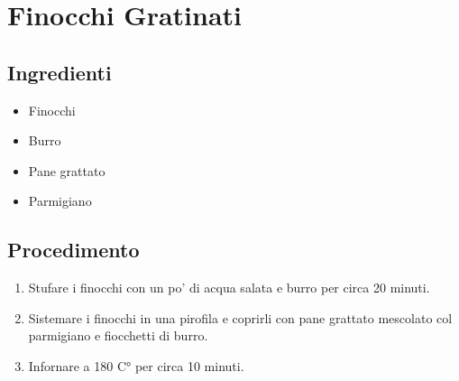 \section{Finocchi Gratinati}
\subsection{Ingredienti}
\begin{itemize}
\item Finocchi  
\item Burro  
\item Pane grattato  
\item Parmigiano
\end{itemize}
\subsection{Procedimento}
\begin{enumerate}
\item  Stufare i finocchi con un po' di acqua salata e burro per circa 20 minuti.  
\item  Sistemare i finocchi in una pirofila e coprirli con pane grattato mescolato col parmigiano e fiocchetti di burro.  
\item  Infornare a 180 C° per circa 10 minuti.
\end{enumerate}
